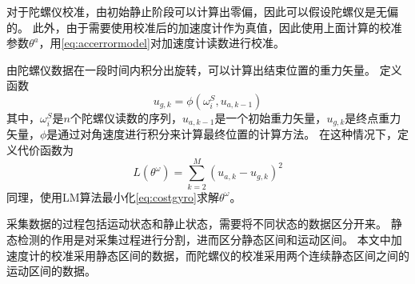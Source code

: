 \documentclass[
  type=master
]{gdutthesis}
\begin{document}
对于陀螺仪校准，由初始静止阶段可以计算出零偏，因此可以假设陀螺仪是无偏的。
此外，由于需要使用校准后的加速度计作为真值，因此使用上面计算的校准参数$\theta^a$，用\autoref{eq:accerrormodel}对加速度计读数进行校准。

由陀螺仪数据在一段时间内积分出旋转，可以计算出结束位置的重力矢量。
定义函数
\begin{equation}\label{eq:integration}
	u_{g,k}=\phi(\omega^S_i , u_{a,k-1})
\end{equation}
其中，$\omega^S_i$是$n$个陀螺仪读数的序列，$u_{a,k-1}$是一个初始重力矢量，$u_{g,k}$是终点重力矢量，$\phi$是通过对角速度进行积分来计算最终位置的计算方法。
在这种情况下，定义代价函数为
\begin{equation}\label{eq:costgyro}
	L(\theta^\omega)=\sum_{k=2}^{M}(u_{a,k}-u_{g,k})^2
\end{equation}
同理，使用LM算法最小化\autoref{eq:costgyro}求解$\theta^\omega$。

采集数据的过程包括运动状态和静止状态，需要将不同状态的数据区分开来。
静态检测的作用是对采集过程进行分割，进而区分静态区间和运动区间。
本文中加速度计的校准采用静态区间的数据，而陀螺仪的校准采用两个连续静态区间之间的运动区间的数据。
\end{document}
